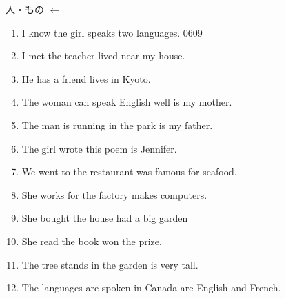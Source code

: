 \documentclass[aspectratio=169,xcolor={dvipsnames,table}]{beamer}
\begin{document}
\begin{frame}[plain,label=ichiran]{人・もの $\leftarrow$ }
 \begin{enumerate}
  \item I know the girl  speaks two languages.%
\hfill{\tiny 0609}\,{\scriptsize {}}
  \item I met the teacher  lived near my house.
  \item He has a friend  lives in Kyoto.
  \item The woman  can speak English well is my mother.
  \item The man  is running in the park is my father.
  \item The girl  wrote this poem is Jennifer.
  \item We went to the restaurant  was famous for seafood.
  \item She works for the factory  makes computers.
  \item She bought the house  had a big garden
  \item She read the book  won the prize.
  \item The tree  stands in the garden is very tall.
  \item The languages  are spoken in Canada are English and French.
 \end{enumerate}
\end{frame}
\end{document}
